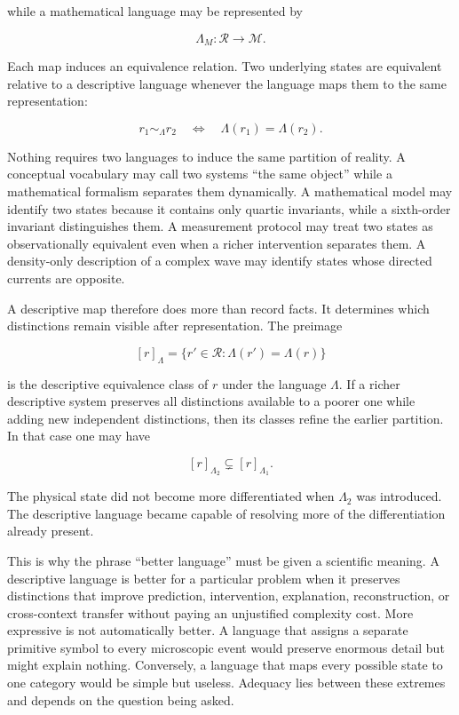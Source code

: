 while a mathematical language may be represented by

\[
\Lambda_M : \mathscr{R} \longrightarrow \mathcal{M}.
\]

Each map induces an equivalence relation. Two underlying states are equivalent relative to a descriptive language whenever the language maps them to the same representation:

\[
r_1\sim_\Lambda r_2
\quad\Longleftrightarrow\quad
\Lambda(r_1)=\Lambda(r_2).
\]

Nothing requires two languages to induce the same partition of reality. A conceptual vocabulary may call two systems ``the same object'' while a mathematical formalism separates them dynamically. A mathematical model may identify two states because it contains only quartic invariants, while a sixth-order invariant distinguishes them. A measurement protocol may treat two states as observationally equivalent even when a richer intervention separates them. A density-only description of a complex wave may identify states whose directed currents are opposite.

A descriptive map therefore does more than record facts. It determines which distinctions remain visible after representation. The preimage

\[
[r]_\Lambda
=
\{r'\in\mathscr R:\Lambda(r')=\Lambda(r)\}
\]

is the descriptive equivalence class of $r$ under the language $\Lambda$. If a richer descriptive system preserves all distinctions available to a poorer one while adding new independent distinctions, then its classes refine the earlier partition. In that case one may have

\[
[r]_{\Lambda_2}\subsetneq[r]_{\Lambda_1}.
\]

The physical state did not become more differentiated when $\Lambda_2$ was introduced. The descriptive language became capable of resolving more of the differentiation already present.

This is why the phrase ``better language'' must be given a scientific meaning. A descriptive language is better for a particular problem when it preserves distinctions that improve prediction, intervention, explanation, reconstruction, or cross-context transfer without paying an unjustified complexity cost. More expressive is not automatically better. A language that assigns a separate primitive symbol to every microscopic event would preserve enormous detail but might explain nothing. Conversely, a language that maps every possible state to one category would be simple but useless. Adequacy lies between these extremes and depends on the question being asked.

